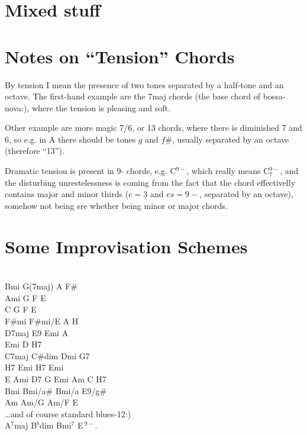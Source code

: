 \documentclass[12pt]{article}
\begin{document}
\section{Mixed stuff}




\newpage

\section{Notes on ``Tension'' Chords}

By tension I mean the presence of two tones separated by a half-tone and an octave.
The first-hand example are the 7maj chords (the base chord of bossa-nova:), where the tension is pleasing and soft.

Other example are more magic 7/6, or 13 chords, where there is diminished 7 and 6, so e.g. in A there should be tones $g$ and $f\#$, usually separated by an octave (therefore ``13''). 

Dramatic tension is present in 9- chords, e.g. C${}^{9-}$, which really means  C${}^{9-}_{7}$, and the disturbing unrestelessness is coming from the fact that the chord effectivelly contains major and minor thirds ($e = 3$ and $es = 9-$, separated by an octave), somehow not being sre whether being minor or major chords.

\section{Some Improvisation Schemes}
{\ }
\bigskip
\\ Bmi G(7maj) A F\#
\bigskip
\\ Ami G F E
\\ C G F E
\bigskip
\\ F\#mi F\#mi/E A H
\bigskip
\\ D7maj E9 Emi A
\bigskip
\\ Emi D H7
\bigskip
\\ C7maj C\#dim Dmi G7
\bigskip
\\ H7 Emi H7 Emi
\\ E Ami D7 G Emi Am C H7
\bigskip
\\ Bmi Bmi/a\# Bmi/a E9/g\#
\bigskip
\\ Am Am/G Am/F E
\bigskip
\\ \ldots and of course standard blues-12:)
\bigskip
\\ A${}^7$maj B${}^b$dim Bmi${}^{7}$ E${\,}^{9-}$.
\end{document}
